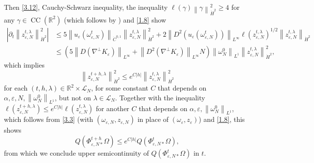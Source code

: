 \documentclass[reqno,centertags,12pt]{amsart}
\theoremstyle{definition}
\numberwithin{equation}{section}
\newcommand{\abs}[1]{\left\lvert#1\right\rvert}
\newcommand{\norm}[1]{\left\|#1\right\|}
\newcommand{\bbR}{{\mathbb{R}}}
\newcommand{\eps}{\varepsilon}
\begin{document}
Then \eqref{3.12}, Cauchy-Schwarz inequality, the inequality
$\ell(\gamma)\norm{\gamma}_{\dot{H}^{2}}^{2} \geq 4$
for any $\gamma\in\operatorname{CC}(\bbR^{2})$
(which follows by \cite[Lemma~A.1]{JeoZlaTouching}) and \eqref{1.8} show
\begin{align*}
    \abs{\partial_{t}\norm{z_{\eps,N}^{t,\lambda}}_{\dot{H}^{2}}^{2}}
    &\leq 5\norm{u_{\eps}(\omega_{\eps,N}^{t})}_{\dot{C}^{0,1}}
    \norm{z_{\eps,N}^{t,\lambda}}_{\dot{H}^{2}}^{2}
    + 2\norm{D^{2}(u_{\eps}(\omega_{\eps,N}^{t}))}_{L^{\infty}}
    \ell(z_{\eps,N}^{t,\lambda})^{1/2}\norm{z_{\eps,N}^{t,\lambda}}_{\dot{H}^{2}} \\
    &\leq \left(
        5\norm{D(\nabla^{\perp}K_{\eps})}_{L^{\infty}}
        + \norm{D^{2}(\nabla^{\perp}K_{\eps})}_{L^{\infty}}N
    \right)\norm{\omega_{N}^{0}}_{L^{1}}
    \norm{z_{\eps,N}^{t,\lambda}}_{\dot{H}^{2}}^{2},
\end{align*}
which implies
\[
    \norm{z_{\eps,N}^{t+h,\lambda}}_{\dot{H}^{2}}^{2}
    \leq e^{C\abs{h}}\norm{z_{\eps,N}^{t,\lambda}}_{\dot{H}^{2}}^{2}
\]
for each $(t,h,\lambda)\in\bbR^{2}\times\mathcal{L}_{N}$, for some constant
$C$ that depends on ${\alpha,\eps,N,\norm{\omega_{N}^{0}}_{L^{1}}}$, but not on
$\lambda\in\mathcal{L}_{N}$. Together with the inequality
$\ell(z_{\eps,N}^{t+h,\lambda}) \leq e^{C\abs{h}}\ell(z_{\eps,N}^{t,\lambda})$
for another $C$ that depends on ${\alpha,\eps,\norm{\omega_{N}^{0}}_{L^{1}}}$,
which follows from \eqref{3.3} (with $(\omega_{\eps,N},z_{\eps,N})$
in place of $(\omega_{\eps},z_{\eps})$) and \eqref{1.8}, this shows
\[
    Q(\Phi_{\eps,N*}^{t+h}\Omega) \leq e^{C\abs{h}}Q(\Phi_{\eps,N*}^{t}\Omega),
\]
from which we conclude upper semicontinuity of $Q(\Phi_{\eps,N*}^{t}\Omega)$ in $t$.
\end{document}
